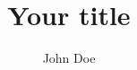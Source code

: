 \documentclass{beamer}
\title{Your title}
\author{John Doe}
\begin{document}
\frame{\maketitle} %
\end{document}

